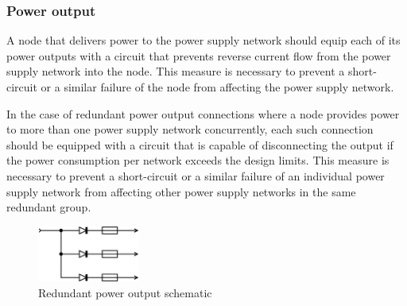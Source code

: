 \subsubsection{Power output}

A node that delivers power to the power supply network should equip each of its power outputs
with a circuit that prevents reverse current flow from the power supply network into the node.
This measure is necessary to prevent a short-circuit or a similar failure of the node from affecting
the power supply network.

In the case of redundant power output connections where a node provides power to more than one power supply network
concurrently, each such connection should be equipped with a circuit that is capable of disconnecting the output
if the power consumption per network exceeds the design limits.
This measure is necessary to prevent a short-circuit or a similar failure of an individual power supply network
from affecting other power supply networks in the same redundant group.

\begin{figure}[H]
    \centering
	\includegraphics[width=0.3\textwidth]{physical/redundant_power_source}
	\caption{Redundant power output schematic}
\end{figure}
